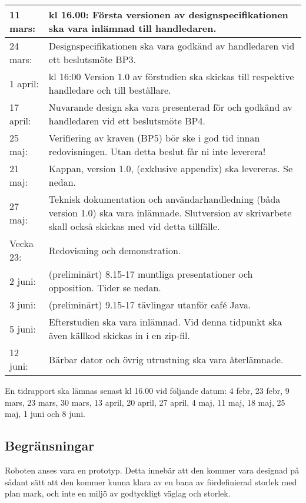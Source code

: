 \documentclass[11pt]{article}
\begin{document}
\begin{flushleft}
\begin{center}
\begin{longtable}{|l |p{.8\linewidth}|}
11 mars: & 
kl 16.00: Första versionen av designspecifikationen ska vara inlämnad till handledaren. \\ \hline

24 mars: &
Designspecifikationen ska vara godkänd av handledaren vid ett beslutsmöte BP3. \\ \hline

1 april: &
kl 16:00 Version 1.0 av förstudien ska skickas till respektive handledare och till beställare. \\ \hline

17 april: & 
Nuvarande design ska vara presenterad för och godkänd av handledaren vid ett beslutsmöte BP4. \\ \hline

25 maj: &
Verifiering av kraven (BP5) bör ske i god tid innan redovisningen. Utan detta beslut får ni inte leverera! \\ \hline

21 maj: &
Kappan, version 1.0, (exklusive appendix) ska levereras. Se nedan. \\ \hline

27 maj: &
Teknisk dokumentation och användarhandledning (båda version 1.0) ska vara inlämnade. Slutversion av skrivarbete skall också skickas med vid detta tillfälle. \\ \hline

Vecka 23: &
Redovisning och demonstration.\\ \hline

2 juni: &
(preliminärt) 8.15-17 muntliga presentationer och opposition. Tider se nedan. \\ \hline

3 juni: &
(preliminärt) 9.15-17 tävlingar utanför café Java. \\ \hline

5 juni: &
Efterstudien ska vara inlämnad. Vid denna tidpunkt ska även källkod skickas in i en zip-fil. \\ \hline

12 juni: &
Bärbar dator och övrig utrustning ska vara återlämnade. \\ \hline
\end{longtable}
\end{center}

En tidrapport ska lämnas senast kl 16.00 vid följande datum: 4 febr, 23 febr, 9 mars, 23 mars, 30 mars, 13 april, 20 april, 27 april, 4 maj, 11 maj, 18 maj, 25 maj, 1 juni och 8 juni.

\subsection{Begränsningar} %
Roboten anses vara en prototyp. Detta innebär att den kommer vara designad på sådant sätt att den kommer kunna klara av en bana av fördefinierad storlek med plan mark, och inte en miljö av godtyckligt väglag och storlek. 


\end{flushleft}
\end{document}
